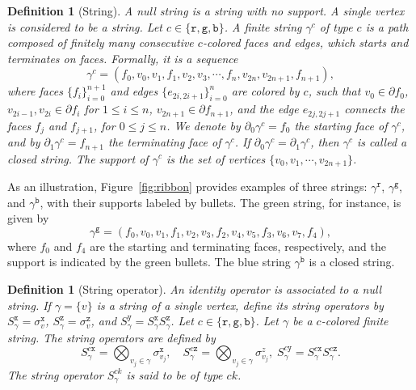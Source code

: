 \documentclass[a4paper,11pt]{article}
\newtheorem{definition}[theorem]{Definition}
\theoremstyle{definition}
\theoremstyle{remark}
\theoremstyle{remark}
\begin{document}
\begin{definition}[String]
A null string is a string with no support. 
A single vertex is considered to be a string. 
Let $c\in \{\mathtt{r},\mathtt{g},\mathtt{b}\}$. 
A finite string $\gamma^c$ of type $c$ is a path composed of finitely many consecutive $c$-colored faces and edges, which starts and terminates on faces.
Formally, it is a sequence
\begin{equation*}
\gamma^c = (f_0,v_0, v_1,f_1, v_2, v_3,  \cdots, f_n, v_{2n},v_{2n+1},f_{n+1}),
\end{equation*}
where faces $\{f_i\}_{i=0}^{n+1}$ and edges $\{e_{2i,2i+1}\}_{i=0}^n$ are colored by $c$, such that $v_0\in \partial f_0$, $v_{2i-1},v_{2i} \in \partial f_{i}$ for $1\leq i\leq n$, $v_{2n+1}\in \partial f_{n+1}$, and the edge $e_{2j,2j+1}$ connects the faces $f_{j}$ and $f_{j+1}$, for $0\leq j\leq n$. 
We denote by $\partial_0 \gamma^c = f_0$ the starting face of $\gamma^c$, and by $\partial_1 \gamma^c = f_{n+1}$ the terminating face of $\gamma^c$.
If $\partial_0\gamma^c=\partial_1\gamma^c$, then $\gamma^c$ is called a closed string. 
The support of $\gamma^c$ is the set of vertices $\{v_0,v_1,\cdots,v_{2n+1}\}$.
\end{definition}

As an illustration, Figure~\ref{fig:ribbon} provides examples of three strings: $\gamma^{\mathtt{r}}$, $\gamma^{\mathtt{g}}$, and $\gamma^{\mathtt{b}}$, with their supports labeled by bullets. The green string, for instance, is given by
\begin{equation*}
\gamma^{\mathtt{g}} = (f_0, v_0, v_1, f_1, v_2, v_3, f_2, v_4, v_5, f_3, v_6, v_7, f_4),
\end{equation*}
where $f_0$ and $f_4$ are the starting and terminating faces, respectively, and the support is indicated by the green bullets.
The blue string $\gamma^{\mathtt{b}}$ is a closed string. 



\begin{definition}[String operator]
    An identity operator is associated to a null string.
    If $\gamma=\{v\}$ is a string of a single vertex, define its string operators by $S_\gamma^{\mathtt{x}} = \sigma_v^{\mathtt{x}}$, $S_\gamma^{\mathtt{z}} = \sigma_v^{\mathtt{z}}$, and $S_{\gamma}^{\mathtt{y}} = S_{\gamma}^{\mathtt{x}}S_{\gamma}^{\mathtt{z}}$. 
    Let $c\in \{\mathtt{r},\mathtt{g},\mathtt{b}\}$.  Let $\gamma$ be a $c$-colored finite string.  
    The string operators are defined by 
    \begin{equation*}
        S_{\gamma}^{c\mathtt{x}} = \bigotimes_{v_j\in \gamma} \sigma_{v_j}^\mathtt{x},\quad S_{\gamma}^{c\mathtt{z}} = \bigotimes_{v_j\in \gamma} \sigma_{v_j}^z,\; S_{\gamma}^{c\mathtt{y}} = S_{\gamma}^{c\mathtt{x}} S_{\gamma}^{c\mathtt{z}}.
    \end{equation*}
    The string operator $S_{\gamma}^{ck}$ is said to be of type $ck$. 
\end{definition}
\end{document}
